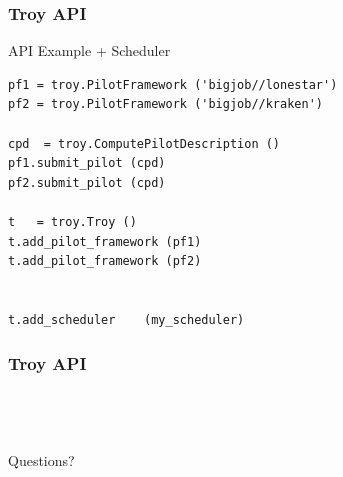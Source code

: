 \documentclass{beamer}
\begin{document}
\begin{frame}[fragile] 
 \frametitle{Troy API}
 {\footnotesize
  \begin{block}{API Example + Scheduler}
   \begin{verbatim}
pf1 = troy.PilotFramework ('bigjob//lonestar')
pf2 = troy.PilotFramework ('bigjob//kraken')

cpd  = troy.ComputePilotDescription ()
pf1.submit_pilot (cpd)
pf2.submit_pilot (cpd)

t   = troy.Troy ()
t.add_pilot_framework (pf1)
t.add_pilot_framework (pf2)

                               
t.add_scheduler    (my_scheduler)
   \end{verbatim}
  \end{block}
 }
\end{frame}



\begin{frame}[fragile] 
 \frametitle{Troy API}
 {\footnotesize
   \begin{block}{}
   \centering
     ~\\
     ~\\
     ~\\
     \LARGE Questions?\\
     ~\\
     ~
  \end{block}
 }
\end{frame}
\end{document}
